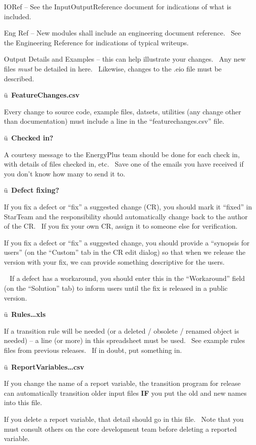IORef -- See the InputOutputReference document for indications of what is included.

Eng Ref -- New modules shall include an engineering document reference.~ See the Engineering Reference for indications of typical writeups.

Output Details and Examples -- this can help illustrate your changes.~ Any new files \emph{must} be detailed in here.~ Likewise, changes to the .eio file must be described.

ü~\textbf{FeatureChanges.csv}

Every change to source code, example files, datsets, utilities (any change other than documentation) must include a line in the ``featurechanges.csv'' file.

ü~\textbf{Checked in?}

A courtesy message to the EnergyPlus team should be done for each check in, with details of files checked in, etc.~ Save one of the emails you have received if you don't know how many to send it to.

ü~\textbf{Defect fixing?}

If you fix a defect or ``fix'' a suggested change (CR), you should mark it ``fixed'' in StarTeam and the responsibility should automatically change back to the author of the CR.~ If you fix your own CR, assign it to someone else for verification.

If you fix a defect or ``fix'' a suggested change, you should provide a ``synopsis for users'' (on the ``Custom'' tab in the CR edit dialog) so that when we release the version with your fix, we can provide something descriptive for the users.

~ If a defect has a workaround, you should enter this in the ``Workaround'' field (on the ``Solution'' tab) to inform users until the fix is released in a public version.

ü~\textbf{Rules\ldots{}xls}

If a transition rule will be needed (or a deleted / obsolete / renamed object is needed) -- a line (or more) in this spreadsheet must be used.~ See example rules files from previous releases.~ If in doubt, put something in.

ü~\textbf{ReportVariables\ldots{}csv}

If you change the name of a report variable, the transition program for release can automatically transition older input files \textbf{IF} you put the old and new names into this file.

If you delete a report variable, that detail should go in this file.~ Note that you must consult others on the core development team before deleting a reported variable.
